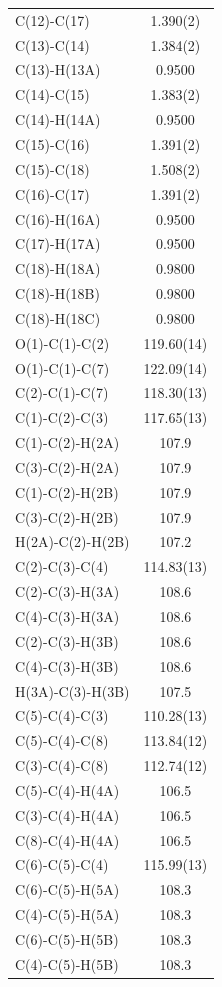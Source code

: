 \begin{center}
{\begin{supertabular}{p{1.5in}c}
C(12)-C(17) &	1.390(2) \\
C(13)-C(14) 	&1.384(2) \\
C(13)-H(13A) &	0.9500 \\
C(14)-C(15) &	1.383(2) \\
C(14)-H(14A) &	0.9500 \\
C(15)-C(16) &	1.391(2) \\
C(15)-C(18) 	&1.508(2) \\
C(16)-C(17) &	1.391(2) \\
C(16)-H(16A) &	0.9500 \\
C(17)-H(17A) &	0.9500 \\
C(18)-H(18A) &	0.9800 \\
C(18)-H(18B) &	0.9800 \\
C(18)-H(18C) &	0.9800 \\
O(1)-C(1)-C(2)	&119.60(14) \\
O(1)-C(1)-C(7)	&122.09(14) \\
C(2)-C(1)-C(7)	&118.30(13) \\
C(1)-C(2)-C(3)	&117.65(13) \\
C(1)-C(2)-H(2A)&	107.9 \\
C(3)-C(2)-H(2A)&	107.9 \\
C(1)-C(2)-H(2B)&	107.9 \\
C(3)-C(2)-H(2B)&	107.9 \\
H(2A)-C(2)-H(2B)&	107.2 \\
C(2)-C(3)-C(4)&	114.83(13) \\
C(2)-C(3)-H(3A)&	108.6 \\
C(4)-C(3)-H(3A)&	108.6 \\
C(2)-C(3)-H(3B)&	108.6 \\ 
C(4)-C(3)-H(3B)&	108.6 \\
H(3A)-C(3)-H(3B)&	107.5 \\
C(5)-C(4)-C(3)&	110.28(13) \\
C(5)-C(4)-C(8)&	113.84(12) \\
C(3)-C(4)-C(8)&	112.74(12) \\
C(5)-C(4)-H(4A)&	106.5 \\
C(3)-C(4)-H(4A)&	106.5 \\
C(8)-C(4)-H(4A)&	106.5 \\
C(6)-C(5)-C(4)&	115.99(13) \\
C(6)-C(5)-H(5A)&	108.3 \\
C(4)-C(5)-H(5A)&	108.3 \\
C(6)-C(5)-H(5B)&	108.3 \\
C(4)-C(5)-H(5B)&	108.3 \\

\end{supertabular}}
\end{center}
